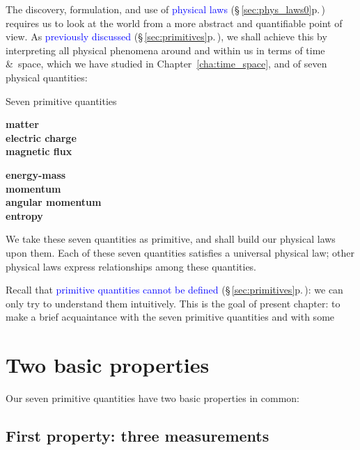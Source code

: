 \documentclass[a4paper,12pt,%
onecolumn,oneside,%
british%
]{memoir}
\newcommand*{\amp}{\&}
\renewcommand*{\|}[1][]{\nonscript\:#1\vert\nonscript\:\mathopen{}}
\newcommand*{\sect}{\S}%
\newcommand*{\chap}{Chapter}%
\renewcommand*{\autoref}[3][\sect\,\ref]{\textcolor{blue}{#3} {\color{blue}\scriptsize(\faIcon[regular]{eye}\;#1{#2}\;p.\,\pageref{#2})}}
\newcommand*{\energym}{energy-mass}
\begin{document}
The discovery, formulation, and use of \autoref{sec:phys_laws0}{physical laws} requires us to look at the world from a more abstract and quantifiable point of view.
As \autoref{sec:primitives}{previously discussed}, we shall achieve this by interpreting all physical phenomena around and within us in terms of time \amp\ space, which we have studied in \chap~\ref{cha:time_space}, and of seven physical quantities:
\begin{definition}{Seven primitive quantities}
  \begin{minipage}[c]{0.49\linewidth}
    \begin{center}\bfseries
      matter
      \\ electric charge
      \\ magnetic flux
    \end{center}
  \end{minipage}\hfill
  \begin{minipage}[c]{0.49\linewidth}
    \begin{center}\bfseries
      \energym
      \\ momentum
      \\ angular momentum
      \\[2\jot] entropy
    \end{center}
  \end{minipage}
\end{definition}
We take these seven quantities as primitive, and shall build our physical laws upon them. Each of these seven quantities satisfies a universal physical law; other physical laws express relationships among these quantities.

Recall that \autoref{sec:primitives}{primitive quantities cannot be defined}: we can only try to understand them intuitively. This is the goal of present chapter: to make a brief acquaintance with the seven primitive quantities and with some%

\section{Two basic properties}
\label{sec:sevenquantities_properties}

Our seven primitive quantities have two basic properties in common:

\subsection{First property: three measurements}
\label{sec:sevenquantities_property1}
\end{document}
